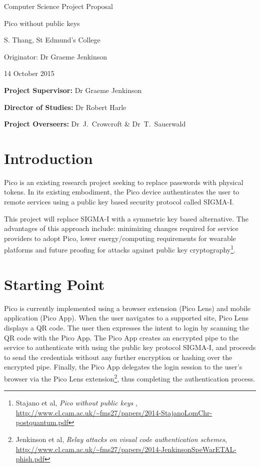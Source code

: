 \documentclass[12pt,a4paper,twoside]{article}
\begin{document}
\vfil

\centerline{\Large Computer Science Project Proposal}
\vspace{0.4in}
\centerline{\Large Pico without public keys}
\vspace{0.4in}
\centerline{\large S. Thang, St Edmund’s College}
\vspace{0.3in}
\centerline{\large Originator: Dr Graeme Jenkinson}
\vspace{0.3in}
\centerline{\large 14 October 2015}

\vfil


\noindent
{\bf Project Supervisor:} Dr Graeme Jenkinson
\vspace{0.2in}

\noindent
{\bf Director of Studies:} Dr Robert Harle
\vspace{0.2in}
\noindent
 
\noindent
{\bf Project Overseers:} Dr~J.~Crowcroft \& Dr~T.~Sauerwald



\section*{Introduction}


Pico is an existing research project seeking to replace passwords with physical tokens. In its existing embodiment, the Pico device authenticates the user to remote services using a public key based security protocol called SIGMA-I. 

This project will replace SIGMA-I with a symmetric key based alternative. The advantages of this approach include: minimizing changes required for service providers to adopt Pico, lower energy/computing requirements for wearable platforms and future proofing for attacks against public key cryptography\footnote{Stajano et al, \textit{Pico without public keys
}, \url{http://www.cl.cam.ac.uk/~fms27/papers/2014-StajanoLomChr-postquantum.pdf}}.

\section*{Starting Point}

Pico is currently implemented using a browser extension (Pico Lens) and mobile application (Pico App). When the user navigates to a supported site, Pico Lens displays a QR code. The user then expresses the intent to login by scanning the QR code with the Pico App. The Pico App creates an encrypted pipe to the service to authenticate with using the public key protocol SIGMA-I, and proceeds to send the credentials without any further encryption or hashing over the encrypted pipe. Finally, the Pico App delegates the login session to the user's browser via the Pico Lens extension\footnote{Jenkinson et al, \textit{Relay attacks on visual code authentication schemes}, \url{http://www.cl.cam.ac.uk/~fms27/papers/2014-JenkinsonSpeWarETAL-phish.pdf}}, thus completing the authentication process.
\end{document}
